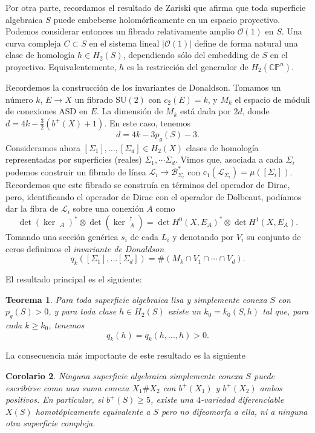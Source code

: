 \documentclass[12pt, a4paper]{amsart}
\newcommand\CC{\mathbb{C}}
\newcommand\BB{\mathcal{B}}
\newcommand\LL{\mathscr{L}}
\newcommand\OO{\mathscr{O}}
\DeclareMathOperator\delbar{\bar{\partial}}
\newtheorem{thm}{Teorema}[section]
\newtheorem{corol}[thm]{Corolario}
\theoremstyle{remark} \newtheorem{rmk}[thm]{Observación}
\theoremstyle{remark} \newtheorem{rmks}[thm]{Observaciones}
\theoremstyle{definition} \newtheorem{defn}[thm]{Definición}
\theoremstyle{definition} \newtheorem{ejs}[thm]{Ejemplos}
\theoremstyle{definition} \newtheorem{ej}[thm]{Ejemplo}
\begin{document}
	Por otra parte, recordamos el resultado de Zariski que afirma que toda superficie algebraica $S$ puede embeberse holomórficamente en un espacio proyectivo. Podemos considerar entonces un fibrado relativamente amplio $\OO(1)$ en $S$. Una curva compleja $C\subset S$ en el sistema lineal $|\OO(1)|$ define de forma natural una clase de homología $h \in H_2(S)$, dependiendo sólo del embedding de $S$ en el proyectivo. Equivalentemente, $h$ es la restricción del generador de $H_2(\CC\mathbb{P}^n)$.

	Recordemos la construcción de los invariantes de Donaldson. Tomamos un número $k$,  $E\rightarrow X$ un fibrado $\mathrm{SU}(2)$ con $c_2(E)=k$, y $M_k$ el espacio de móduli de conexiones ASD en $E$. La dimensión de $M_k$ está dada por $2d$, donde $d=4k-\tfrac{3}{2}(b^+(X)+1)$. En este caso, tenemos
	\begin{equation*}
		d=4k- 3p_g(S) -3.
	\end{equation*} 
	Consideramos ahora $[\Sigma_1],\dots,[\Sigma_d]\in H_2(X)$ clases de homología representadas por superficies (reales) $\Sigma_1,\cdots \Sigma_d$. Vimos que, asociada a cada $\Sigma_i$ podemos construir un fibrado de línea $\LL_i \rightarrow \BB^*_{\Sigma_i}$ con $c_1(\LL_{\Sigma_i})=\mu([\Sigma_i])$. Recordemos que este fibrado se construía en términos del operador de Dirac, pero, identificando el operador de Dirac con el operador de Dolbeaut, podíamos dar la fibra de $\LL_i$ sobre una conexión $A$ como
	\begin{equation*}
		\det (\ker \delbar_A)^* \otimes \det (\ker \delbar_A^\dagger) = \det H^0(X,E_A)^* \otimes \det H^1(X,E_A).
	\end{equation*} 
	Tomando una sección genérica $s_i$ de cada $L_i$ y denotando por $V_i$ su conjunto de ceros definimos el \emph{invariante de Donaldson}  
	\begin{equation*}
		q_k([\Sigma_1],\dots [\Sigma_d]) = \# (M_k \cap V_1 \cap \cdots \cap V_d).
	\end{equation*} 

	El resultado principal es el siguiente:
	\begin{thm}
		Para toda superficie algebraica lisa y simplemente conexa $S$ con $p_g(S)>0$, y para toda clase $h\in H_2(S)$ existe un $k_0=k_0(S,h)$ tal que, para cada $k\geq k_0$, tenemos
		\begin{equation*}
			q_{k}(h)=q_k(h,...,h)>0.
		\end{equation*} 
	\end{thm}

	La consecuencia más importante de este resultado es la siguiente
	\begin{corol}
		Ninguna superficie algebraica simplemente conexa $S$ puede escribirse como una suma conexa $X_1 \# X_2$	con $b^+(X_1)$ y $b^+(X_2)$ ambos positivos. En particular, si $b^+(S)\geq 5$, existe una $4$-variedad diferenciable $X(S)$ homotópicamente equivalente a $S$ pero no difeomorfa a ella, ni a ninguna otra superficie compleja.	
	\end{corol}
\end{document}
